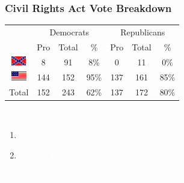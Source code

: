 \documentclass[slides]{beamer}\usepackage[]{graphicx}\usepackage[]{color}
\begin{document}
\begin{frame}
\frametitle{Civil Rights Act Vote Breakdown}

\begin{center}
	\begin{tabular}{c|ccc|ccc}
     & \multicolumn{3}{c|}{Democrats}  & \multicolumn{3}{c}{Republicans} \\ 
     & Pro & Total & \% & Pro & Total & \% \\ 
     \hline
     \includegraphics[height=0.4cm]{conf} & 8 & 91 & 8\% & 0 & 11 & 0\% \\ 
	 \includegraphics[height=0.4cm]{union} & 144 & 152 & 95\% & 137 & 161 & 85\% \\ 
    \hline
     Total & 152 & 243 & 62\% & 137 & 172 & 80\% \\ 
  \end{tabular}
\end{center}

\textcolor{white}{We observe that} 
\begin{enumerate}
\item[] \textcolor{white}{91/(91 + 152) = 37\% of Democrats}
\item[] \textcolor{white}{11/(11+161) = 6\% of Republicans}
\end{enumerate}
\textcolor{white}{were from former confederate states.}

\end{frame}
\end{document}
